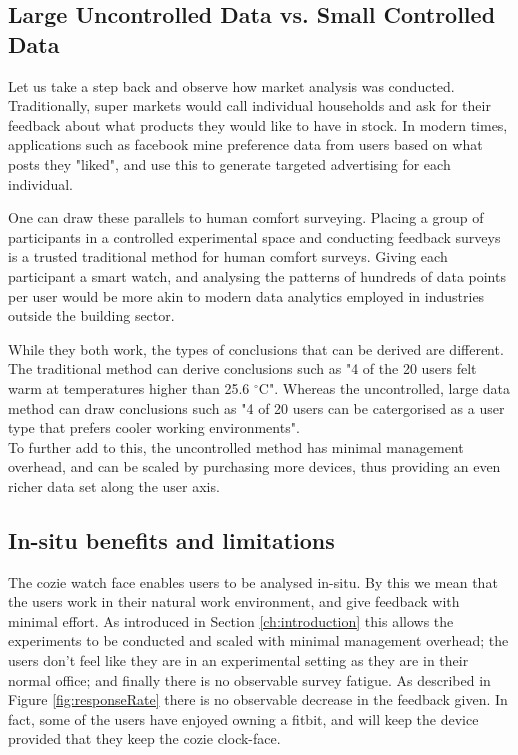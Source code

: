 
\subsection{Large Uncontrolled Data vs. Small Controlled Data}

Let us take a step back and observe how market analysis was conducted. Traditionally, super markets would call individual households and ask for their feedback about what products they would like to have in stock. In modern times, applications such as facebook mine preference data from users based on what posts they "liked", and use this to generate targeted advertising for each individual.

One can draw these parallels to human comfort surveying. Placing a group of participants in a controlled experimental space and conducting feedback surveys is a trusted traditional method for human comfort surveys. Giving each participant a smart watch, and analysing the patterns of hundreds of data points per user would be more akin to modern data analytics employed in industries outside the building sector. 



While they both work, the types of conclusions that can be derived are different. The traditional method can derive conclusions such as "4 of the 20 users felt warm at temperatures higher than 25.6 $^\circ$C". Whereas the uncontrolled, large data method can draw conclusions such as "4 of 20 users can be catergorised as a user type that prefers cooler working environments".\\


To further add to this, the uncontrolled method has minimal management overhead, and can be scaled by purchasing more devices, thus providing an even richer data set along the user axis. 

\subsection{In-situ benefits and limitations}

The cozie watch face enables users to be analysed in-situ. By this we mean that the users work in their natural work environment, and give feedback with minimal effort. As introduced in Section \ref{ch:introduction} this allows the experiments to be conducted and scaled with minimal management overhead; the users don't feel like they are in an experimental setting as they are in their normal office; and finally there is no observable survey fatigue. As described in Figure \ref{fig:responseRate} there is no observable decrease in the feedback given. In fact, some of the users have enjoyed owning a fitbit, and will keep the device provided that they keep the cozie clock-face.\\

